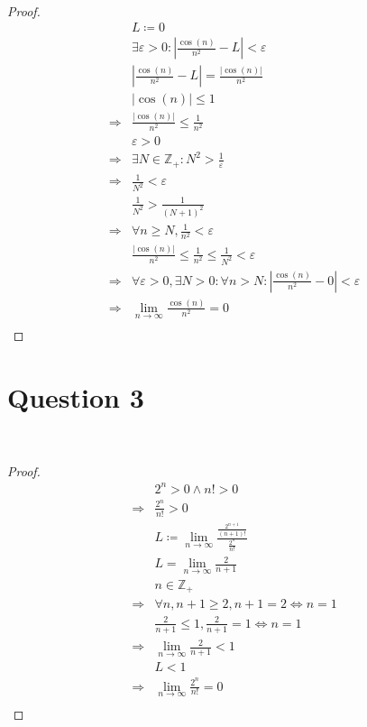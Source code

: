 \documentclass{article}
\begin{document}
~

\begin{proof}
    \begin{align*}
        &L\coloneqq 0\\
        &\exists\varepsilon>0:\left|\frac{\cos(n)}{n^2}-L \right|<\varepsilon\\
        &\left|\frac{\cos(n)}{n^2}-L \right|=\frac{\left|\cos(n)\right|}{n^2}\\
        &\left|\cos(n)\right|\leqslant1\\
        \Rightarrow&\frac{\left|\cos(n)\right|}{n^2}\leqslant\frac{1}{n^2}\\
        &\varepsilon>0\\
        \Rightarrow&\exists N\in\mathbb{Z} _+:N^2>\frac{1}{\varepsilon}\\
        \Rightarrow&\frac{1}{N^2}<\varepsilon\\
        &\frac{1}{N^2}>\frac{1}{(N+1)^2}\\
        \Rightarrow&\forall n\geqslant N,\frac{1}{n^2}<\varepsilon\\
        &\frac{\left|\cos(n)\right|}{n^2}\leqslant\frac{1}{n^2}\leqslant \frac{1}{N^2}<\varepsilon\\
        \Rightarrow&\forall\varepsilon>0,\exists N>0:\forall n>N:\left|\frac{\cos(n)}{n^2}-0 \right|<\varepsilon\\
        \Rightarrow&\lim_{n\to\infty}\frac{\cos(n)}{n^2}=0\\
    \end{align*}
\end{proof}

\newpage

\section*{Question 3}

~

\begin{proof}
    \begin{align*}
        &2^n>0\land n!>0\\
        \Rightarrow&\frac{2^n}{n!}>0\\
        &L\coloneqq \lim_{n\to\infty}\frac{\frac{2^{n+1}}{(n+1)!}}{\frac{2^n}{n!}}\\
        &L=\lim_{n\to\infty}\frac{2}{n+1}\\
        &n\in\mathbb{Z} _+\\
        \Rightarrow&\forall n,n+1\geqslant 2,n+1=2\Leftrightarrow n=1\\
        &\frac{2}{n+1}\leqslant 1,\frac{2}{n+1}=1\Leftrightarrow n=1\\
        \Rightarrow&\lim_{n\to\infty}\frac{2}{n+1}<1\\
        &L<1\\
        \Rightarrow&\lim_{n\to\infty}\frac{2^n}{n!}=0\\
    \end{align*}
\end{proof}
\end{document}

